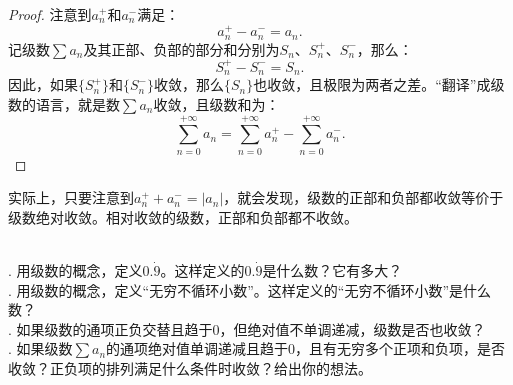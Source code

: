 \documentclass[12pt,UTF8,fontset=none]{ctexbook}
\begin{document}
\begin{proof}
    注意到$a_n^+$和$a_n^-$满足：
    $$ a_n^+ - a_n^- = a_n. $$
    记级数$\sum a_n$及其正部、负部的部分和分别为$S_n$、$S_n^+$、$S_n^-$，那么：
    $$ S_n^+ - S_n^- = S_n. $$
    因此，如果$\{S_n^+\}$和$\{S_n^-\}$收敛，那么$\{S_n\}$也收敛，且极限为两者之差。“翻译”成级数的语言，就是数$\sum a_n$收敛，且级数和为：
    $$\sum_{n=0}^{+\infty} a_n = \sum_{n=0}^{+\infty} a_n^+ - \sum_{n=0}^{+\infty} a_n^-.$$ 
\end{proof}

实际上，只要注意到$ a_n^+ + a_n^- = |a_n|$，就会发现，级数的正部和负部都收敛等价于级数绝对收敛。相对收敛的级数，正部和负部都不收敛。

\begin{sk}
    \mbox{} \\
    . 用级数的概念，定义$0.\dot{9}$。这样定义的$0.\dot{9}$是什么数？它有多大？\\
    . 用级数的概念，定义“无穷不循环小数”。这样定义的“无穷不循环小数”是什么数？\\
    . 如果级数的通项正负交替且趋于$0$，但绝对值不单调递减，级数是否也收敛？\\
    . 如果级数$\sum a_n$的通项绝对值单调递减且趋于$0$，且有无穷多个正项和负项，是否收敛？正负项的排列满足什么条件时收敛？给出你的想法。
    
\end{sk}
\end{document}
